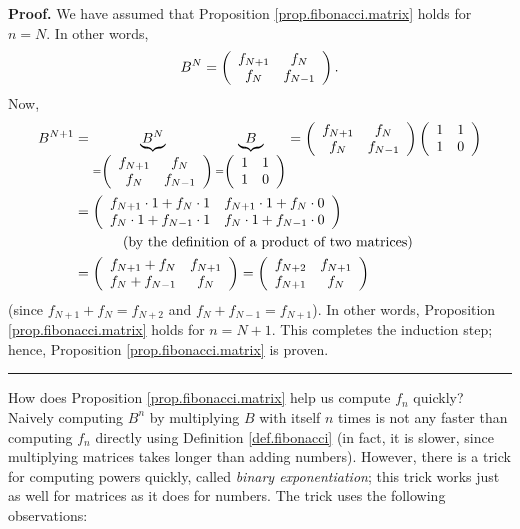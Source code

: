 \documentclass[numbers=enddot,12pt,final,onecolumn,notitlepage]{scrartcl}%
\theoremstyle{definition}
\newenvironment{proof}[1][Proof]{\noindent\textbf{#1.} }{\ \rule{0.5em}{0.5em}}
\begin{document}
\begin{proof}
We have assumed that Proposition \ref{prop.fibonacci.matrix} holds for $n=N$.
In other words,%
\[
B^{N}=\left(
\begin{array}
[c]{cc}%
f_{N+1} & f_{N}\\
f_{N} & f_{N-1}%
\end{array}
\right)  .
\]
Now,
\begin{align*}
B^{N+1}  &  =\underbrace{B^{N}}_{=\left(
\begin{array}
[c]{cc}%
f_{N+1} & f_{N}\\
f_{N} & f_{N-1}%
\end{array}
\right)  }\underbrace{B}_{=\left(
\begin{array}
[c]{cc}%
1 & 1\\
1 & 0
\end{array}
\right)  }=\left(
\begin{array}
[c]{cc}%
f_{N+1} & f_{N}\\
f_{N} & f_{N-1}%
\end{array}
\right)  \left(
\begin{array}
[c]{cc}%
1 & 1\\
1 & 0
\end{array}
\right) \\
&  =\left(
\begin{array}
[c]{cc}%
f_{N+1}\cdot1+f_{N}\cdot1 & f_{N+1}\cdot1+f_{N}\cdot0\\
f_{N}\cdot1+f_{N-1}\cdot1 & f_{N}\cdot1+f_{N-1}\cdot0
\end{array}
\right) \\
&  \ \ \ \ \ \ \ \ \ \ \left(  \text{by the definition of a product of two
matrices}\right) \\
&  =\left(
\begin{array}
[c]{cc}%
f_{N+1}+f_{N} & f_{N+1}\\
f_{N}+f_{N-1} & f_{N}%
\end{array}
\right)  =\left(
\begin{array}
[c]{cc}%
f_{N+2} & f_{N+1}\\
f_{N+1} & f_{N}%
\end{array}
\right)
\end{align*}
(since $f_{N+1}+f_{N}=f_{N+2}$ and $f_{N}+f_{N-1}=f_{N+1}$). In other words,
Proposition \ref{prop.fibonacci.matrix} holds for $n=N+1$. This completes the
induction step; hence, Proposition \ref{prop.fibonacci.matrix} is proven.
\end{proof}

How does Proposition \ref{prop.fibonacci.matrix} help us compute $f_{n}$
quickly? Naively computing $B^{n}$ by multiplying $B$ with itself $n$ times is
not any faster than computing $f_{n}$ directly using Definition
\ref{def.fibonacci} (in fact, it is slower, since multiplying matrices takes
longer than adding numbers). However, there is a trick for computing powers
quickly, called \textit{binary exponentiation}; this trick works just as well
for matrices as it does for numbers. The trick uses the following observations:
\end{document}
